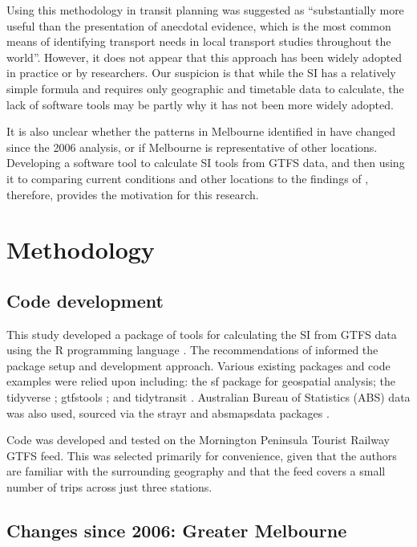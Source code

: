 \documentclass[preprint, 3p,
authoryear]{elsarticle} %
\begin{document}
Using this methodology in transit planning was suggested as
``substantially more useful than the presentation of anecdotal evidence,
which is the most common means of identifying transport needs in local
transport studies throughout the world''\citep{currie2010identifying}.
However, it does not appear that this approach has been widely adopted
in practice or by researchers. Our suspicion is that while the SI has a
relatively simple formula and requires only geographic and timetable
data to calculate, the lack of software tools may be partly why it has
not been more widely adopted.

It is also unclear whether the patterns in Melbourne identified in
\citet{currie2010identifying} have changed since the 2006 analysis, or
if Melbourne is representative of other locations. Developing a software
tool to calculate SI tools from GTFS data, and then using it to
comparing current conditions and other locations to the findings of
\citet{currie2010identifying}, therefore, provides the motivation for
this research.

\section{Methodology}\label{methodology}

\subsection{Code development}\label{code-development}

This study developed a package of tools for calculating the SI from GTFS
data using the R programming language \citep{R-base}. The
recommendations of \citet{wickham2023r} informed the package setup and
development approach. Various existing packages and code examples were
relied upon including: the sf package \citep{R-sf} for geospatial
analysis; the tidyverse \citep{tidyverse2019}; gtfstools
\citep{R-gtfstools}; and tidytransit \citep{R-tidytransit}. Australian
Bureau of Statistics (ABS) data was also used, sourced via the strayr
and absmapsdata packages \citep{r-strayr}.

Code was developed and tested on the Mornington Peninsula Tourist
Railway GTFS feed. This was selected primarily for convenience, given
that the authors are familiar with the surrounding geography and that
the feed covers a small number of trips across just three stations.

\subsection{Changes since 2006: Greater
Melbourne}\label{changes-since-2006-greater-melbourne}
\end{document}

